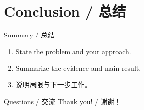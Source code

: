 \documentclass[10pt,aspectratio=169]{beamer}
\begin{document}
\section{Conclusion / 总结}
\begin{frame}{Summary / 总结}
  \begin{enumerate}
    \item State the problem and your approach.
    \item Summarize the evidence and main result.
    \item 说明局限与下一步工作。
  \end{enumerate}
\end{frame}

\begin{frame}{Questions / 交流}
  \centering
  {\color{DGBurgundy}\Huge Thank you! / 谢谢！}
\end{frame}
\end{document}
